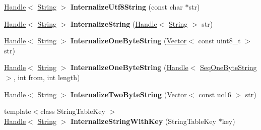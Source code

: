 \begin{DoxyCompactItemize}
\item 
\hypertarget{classv8_1_1internal_1_1_v8___f_i_n_a_l_ad3585d0ca0423db016dd011d6879fa14}{}\hyperlink{classv8_1_1internal_1_1_handle}{Handle}$<$ \hyperlink{classv8_1_1internal_1_1_string}{String} $>$ {\bfseries Internalize\+Utf8\+String} (const char $\ast$str)\label{classv8_1_1internal_1_1_v8___f_i_n_a_l_ad3585d0ca0423db016dd011d6879fa14}

\item 
\hypertarget{classv8_1_1internal_1_1_v8___f_i_n_a_l_ab58e4233b271c8b6f55e61e14de7b90c}{}\hyperlink{classv8_1_1internal_1_1_handle}{Handle}$<$ \hyperlink{classv8_1_1internal_1_1_string}{String} $>$ {\bfseries Internalize\+String} (\hyperlink{classv8_1_1internal_1_1_handle}{Handle}$<$ \hyperlink{classv8_1_1internal_1_1_string}{String} $>$ str)\label{classv8_1_1internal_1_1_v8___f_i_n_a_l_ab58e4233b271c8b6f55e61e14de7b90c}

\item 
\hypertarget{classv8_1_1internal_1_1_v8___f_i_n_a_l_ab0dc7ee97de437af10b8bed88f82a12a}{}\hyperlink{classv8_1_1internal_1_1_handle}{Handle}$<$ \hyperlink{classv8_1_1internal_1_1_string}{String} $>$ {\bfseries Internalize\+One\+Byte\+String} (\hyperlink{classv8_1_1internal_1_1_vector}{Vector}$<$ const uint8\+\_\+t $>$ str)\label{classv8_1_1internal_1_1_v8___f_i_n_a_l_ab0dc7ee97de437af10b8bed88f82a12a}

\item 
\hypertarget{classv8_1_1internal_1_1_v8___f_i_n_a_l_a49fb2f0b464177b54529e7239a17ad3e}{}\hyperlink{classv8_1_1internal_1_1_handle}{Handle}$<$ \hyperlink{classv8_1_1internal_1_1_string}{String} $>$ {\bfseries Internalize\+One\+Byte\+String} (\hyperlink{classv8_1_1internal_1_1_handle}{Handle}$<$ \hyperlink{classv8_1_1internal_1_1_seq_one_byte_string}{Seq\+One\+Byte\+String} $>$, int from, int length)\label{classv8_1_1internal_1_1_v8___f_i_n_a_l_a49fb2f0b464177b54529e7239a17ad3e}

\item 
\hypertarget{classv8_1_1internal_1_1_v8___f_i_n_a_l_ac06a892f288070bab3f07d58e6f647bd}{}\hyperlink{classv8_1_1internal_1_1_handle}{Handle}$<$ \hyperlink{classv8_1_1internal_1_1_string}{String} $>$ {\bfseries Internalize\+Two\+Byte\+String} (\hyperlink{classv8_1_1internal_1_1_vector}{Vector}$<$ const uc16 $>$ str)\label{classv8_1_1internal_1_1_v8___f_i_n_a_l_ac06a892f288070bab3f07d58e6f647bd}

\item 
\hypertarget{classv8_1_1internal_1_1_v8___f_i_n_a_l_afb636e54baeb6a84a9f358f15151f391}{}{\footnotesize template$<$class String\+Table\+Key $>$ }\\\hyperlink{classv8_1_1internal_1_1_handle}{Handle}$<$ \hyperlink{classv8_1_1internal_1_1_string}{String} $>$ {\bfseries Internalize\+String\+With\+Key} (String\+Table\+Key $\ast$key)\label{classv8_1_1internal_1_1_v8___f_i_n_a_l_afb636e54baeb6a84a9f358f15151f391}


\end{DoxyCompactItemize}
